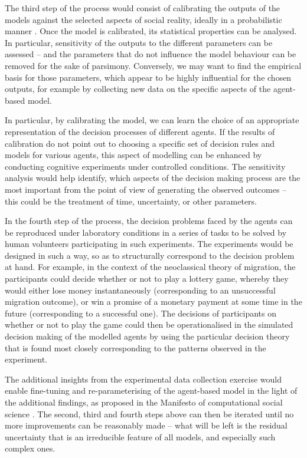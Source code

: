 \documentclass{article}
\begin{document}
The third step of the process would consist of calibrating the outputs of the models against the selected aspects of social reality, ideally in a probabilistic manner \citep{Hilton2016}. Once the model is calibrated, its statistical properties can be analysed. In particular, sensitivity of the outputs to the different parameters can be assessed \citep{Oakley2004} -- and the parameters that do not influence the model behaviour can be removed for the sake of parsimony. Conversely, we may want to find the empirical basis for those parameters, which appear to be highly influential for the chosen outputs, for example by collecting new data on the specific aspects of the agent-based model. 

In particular, by calibrating the model, we can learn the choice of an appropriate representation of the decision processes of different agents. If the results of calibration do not point out to choosing a specific set of decision rules and models for various agents, this aspect of modelling can be enhanced by conducting cognitive experiments under controlled conditions. The sensitivity analysis would help identify, which aspects of the decision making process are the most important from the point of view of generating the observed outcomes -- this could be the treatment of time, uncertainty, or other parameters. 

In the fourth step of the process, the decision problems faced by the agents can be reproduced under laboratory conditions in a series of tasks to be solved by human volunteers participating in such experiments. The experiments would be designed in such a way, so as to structurally correspond to the decision problem at hand. For example, in the context of the neoclassical theory of migration, the participants could decide whether or not to play a lottery game, whereby they would either lose money instantaneously (corresponding to an unsuccessful migration outcome), or win a promise of a monetary payment at some time in the future (corresponding to a successful one). The decisions of participants on whether or not to play the game could then be operationalised in the simulated decision making of the modelled agents by using the particular decision theory that is found most closely corresponding to the patterns observed in the experiment.

The additional insights from the experimental data collection exercise would enable fine-tuning and re-parameterising of the agent-based model in the light of the additional findings, as proposed in the Manifesto of computational social science \citep{Conte}. The second, third and fourth steps above can then be iterated until no more improvements can be reasonably made -- what will be left is the residual uncertainty that is an irreducible feature of all models, and especially such complex ones.
\end{document}
